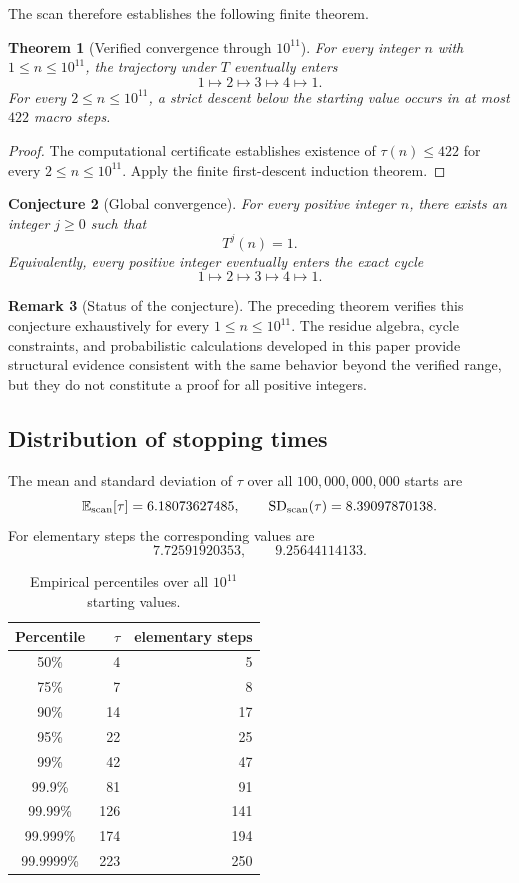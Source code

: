 \documentclass[11pt]{article}
\newtheorem{theorem}{Theorem}[section]
\newtheorem{conjecture}[theorem]{Conjecture}
\theoremstyle{definition}
\newtheorem{remark}[theorem]{Remark}
\newcommand{\Nscan}{100{,}000{,}000{,}000}
\begin{document}
The scan therefore establishes the following finite theorem.

\begin{theorem}[Verified convergence through $10^{11}$]
For every integer $n$ with $1\le n\le10^{11}$, the trajectory under $T$ eventually enters
\[
1\mapsto2\mapsto3\mapsto4\mapsto1.
\]
For every $2\le n\le10^{11}$, a strict descent below the starting value occurs in at most $422$ macro steps.
\end{theorem}

\begin{proof}
The computational certificate establishes existence of $\tau(n)\le422$ for every $2\le n\le10^{11}$. Apply the finite first-descent induction theorem.
\end{proof}

\begin{conjecture}[Global convergence]
For every positive integer $n$, there exists an integer $j\ge0$ such that
\[
T^j(n)=1.
\]
Equivalently, every positive integer eventually enters the exact cycle
\[
1\mapsto2\mapsto3\mapsto4\mapsto1.
\]
\end{conjecture}

\begin{remark}[Status of the conjecture]
The preceding theorem verifies this conjecture exhaustively for every $1\le n\le10^{11}$. The residue algebra, cycle constraints, and probabilistic calculations developed in this paper provide structural evidence consistent with the same behavior beyond the verified range, but they do not constitute a proof for all positive integers.
\end{remark}

\subsection{Distribution of stopping times}

The mean and standard deviation of $\tau$ over all $\Nscan$ starts are
\[
\mathbb E_{\rm scan}[\tau]=6.18073627485,
\qquad
\operatorname{SD}_{\rm scan}(\tau)=8.39097870138.
\]
For elementary steps the corresponding values are
\[
7.72591920353,
\qquad
9.25644114133.
\]

\begin{table}[H]
\centering
\caption{Empirical percentiles over all $10^{11}$ starting values.}
\begin{tabular}{c|rr}
\toprule
Percentile & $\tau$ & elementary steps\\
\midrule
50\% & 4 & 5 \\
75\% & 7 & 8 \\
90\% & 14 & 17 \\
95\% & 22 & 25 \\
99\% & 42 & 47 \\
99.9\% & 81 & 91 \\
99.99\% & 126 & 141 \\
99.999\% & 174 & 194 \\
99.9999\% & 223 & 250 \\
\bottomrule
\end{tabular}
\end{table}
\end{document}
